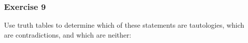 \subsubsection{Exercise 9}
\question Use truth tables to determine which of these statements are tautologies, which are contradictions, and which are neither:

